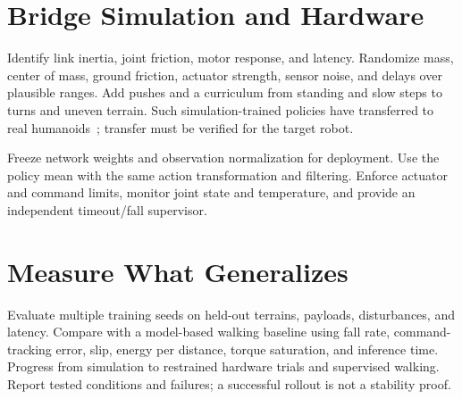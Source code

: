 \section{Bridge Simulation and Hardware}
Identify link inertia, joint friction, motor response, and latency.
Randomize mass, center of mass, ground friction, actuator strength, sensor
noise, and delays over plausible ranges. Add pushes and a curriculum from
standing and slow steps to turns and uneven terrain. Such
simulation-trained policies have transferred to real
humanoids~\cite{radosavovic2024}; transfer must be verified for the target
robot.

Freeze network weights and observation normalization for deployment. Use
the policy mean with the same action transformation and filtering.
Enforce actuator and command limits, monitor joint state and temperature,
and provide an independent timeout/fall supervisor.

\section{Measure What Generalizes}
Evaluate multiple training seeds on held-out terrains, payloads,
disturbances, and latency. Compare with a model-based walking baseline
using fall rate, command-tracking error, slip, energy per distance, torque
saturation, and inference time. Progress from simulation to restrained
hardware trials and supervised walking. Report tested conditions and
failures; a successful rollout is not a stability proof.

\begingroup
\raggedright


\endgroup

